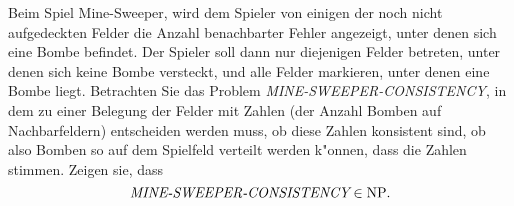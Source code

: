 Beim Spiel Mine-Sweeper, wird dem Spieler von einigen der noch nicht
aufgedeckten Felder die Anzahl benachbarter Fehler angezeigt, unter
denen sich eine Bombe befindet. Der Spieler soll dann nur diejenigen
Felder betreten, unter denen sich keine Bombe versteckt, und alle
Felder markieren, unter denen eine Bombe liegt. Betrachten Sie das
Problem {\it MINE-SWEEPER-CONSISTENCY}, in dem zu einer Belegung der
Felder mit Zahlen (der Anzahl Bomben auf Nachbarfeldern) entscheiden
werden muss, ob diese Zahlen konsistent sind, ob also Bomben so
auf dem Spielfeld verteilt werden k"onnen, dass die Zahlen stimmen.
Zeigen sie, dass
\[
\text{\it MINE-SWEEPER-CONSISTENCY}\in \text{NP}.
\]


